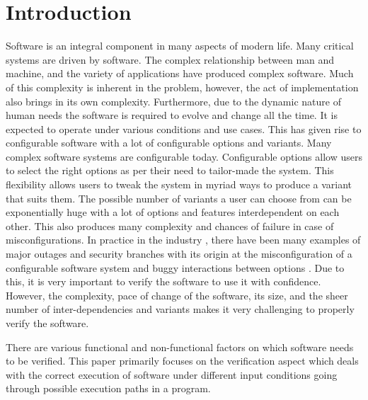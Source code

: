 \documentclass[ runningheads,
               a4paper]{llncs}
\begin{document}
\section{Introduction}
Software is an integral component in many aspects of modern life. Many critical systems are driven by software. The complex relationship between man and machine, and the variety of applications have produced complex software. Much of this complexity is inherent in the problem, however, the act of implementation also brings in its own complexity. Furthermore, due to the dynamic nature of human needs the software is required to evolve and change all the time. It is expected to operate under various conditions and use cases. This has given rise to configurable software with a lot of configurable options and variants. Many complex software systems are configurable today. Configurable options allow users to select the right options as per their need to tailor-made the system. This flexibility allows users to tweak the system in myriad ways to produce a variant that suits them. The possible number of variants a user can choose from can be exponentially huge with a lot of options and features interdependent on each other. This also produces many complexity and chances of failure in case of misconfigurations. In practice in the industry \cite[Holistic configuration management at Facebook]{tang2015holistic}, there have been many examples of major outages and security branches with its origin at the misconfiguration of a configurable software system and buggy interactions between options \cite{han2016empirical, kenner2021safety}. Due to this, it is very important to verify the software to use it with confidence. However, the complexity, pace of change of the software, its size, and the sheer number of inter-dependencies and variants makes it very challenging to properly verify the software.


There are various functional and non-functional factors on which software needs to be verified. This paper primarily focuses on the verification aspect which deals with the correct execution of software under different input conditions going through possible execution paths in a program.
\end{document}

